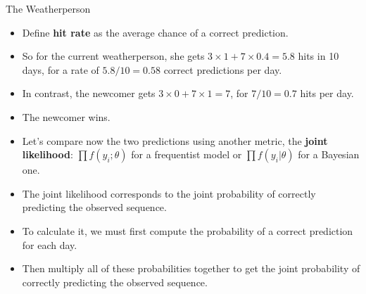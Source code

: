\documentclass[handout]{beamer}
\begin{document}
\begin{frame}{The Weatherperson}
\scriptsize{

\begin{itemize}
\item Define \textbf{hit rate} as the average chance of a correct prediction.
\item So for the current weatherperson, she gets $3 \times 1 + 7 \times 0.4 = 5.8$ hits in 10 days, for a rate of $5.8/10 = 0.58$ correct predictions per day.
\item In contrast, the newcomer gets $3 \times 0 + 7 \times 1 = 7$, for $7/10 = 0.7$ hits per day. 
\item The newcomer wins.

\item Let's compare now the two predictions using another metric, the \textbf{joint likelihood}: $\prod f(y_i;\theta)$ for a frequentist model or $\prod f(y_i|\theta)$ for a Bayesian one.

\item The joint likelihood corresponds to the joint probability of correctly predicting the observed sequence.


\item To calculate it, we must first compute the probability of a correct prediction for each day.

\item Then multiply all of these probabilities together to get the joint probability of correctly predicting the observed sequence. 



\end{itemize}


} 
\end{frame}
\end{document}
